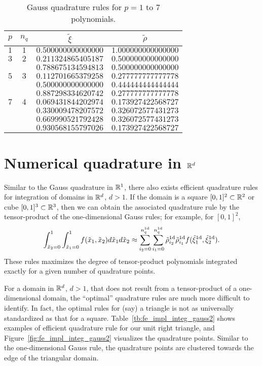 \begin{table}
  \centering
  \begin{tabular}{cccc}
    $p$ & $n_q$ & $\tilde \xi$ & $\tilde \rho$ \\
    \hline
    $1$ & $1$ & $0.500000000000000$ & $1.000000000000000$ \\
    \hline
    $3$ & $2$ & $0.211324865405187$ & $0.500000000000000$ \\ 
    & & $0.788675134594813$ & $0.500000000000000$ \\
    \hline
    $5$ & $3$ & $0.112701665379258$ & $0.277777777777778$ \\ 
     & & $0.500000000000000$ & $0.444444444444444$ \\ 
     & & $0.887298334620742$ & $0.277777777777778$ \\
    \hline
    $7$ & $4$ & $0.069431844202974$ & $0.173927422568727$ \\ 
    & & $0.330009478207572$ & $0.326072577431273$ \\ 
    & & $0.669990521792428$ & $0.326072577431273$ \\ 
    & & $0.930568155797026$ & $0.173927422568727$ 
  \end{tabular}
  \caption{Gauss quadrature rules for $p = 1$ to $7$ polynomials. \label{tb:fe_impl_gauss}}
  \label{tb:integ_gauss}
\end{table}

\section{Numerical quadrature in $\mathbb{R}^d$}
Similar to the Gauss quadrature in $\mathbb{R}^1$, there also exists efficient quadrature rules for integration of domains in $\mathbb{R}^d$, $d > 1$.  If the domain is a square $[0,1]^2 \subset \mathbb{R}^2$ or cube $[0,1]^3 \subset \mathbb{R}^3$, then we can obtain the associated quadrature rule by the tensor-product of the one-dimensional Gauss rules; for example, for $[0,1]^2$, 
\begin{equation*}
  \int_{\tilde x_2=0}^1 \int_{\tilde x_1=0}^1 f(\tilde x_1,\tilde x_2) d\tilde x_1 d\tilde x_2
  \approx \sum_{i_2 = 0}^{n_q^{\rm 1d}} \sum_{i_1 = 0}^{n_q^{\rm 1d}} \tilde \rho_{i_2}^{\rm 1d} \tilde \rho_{i_1}^{\rm 1d} f(\tilde \xi_1^{\rm 1d}, \tilde \xi_2^{\rm 1d}).
\end{equation*}
These rules maximizes the degree of tensor-product polynomials integrated exactly for a given number of quadrature points.

For a domain in $\mathbb{R}^d$, $d > 1$, that does not result from a tensor-product of a one-dimensional domain, the ``optimal'' quadrature rules are much more difficult to identify.  In fact, the optimal rules for (say) a triangle is not as universally standardized as that for a square. Table~\ref{tb:fe_impl_integ_gauss2} shows examples of efficient quadrature rule for our unit right triangle, and Figure~\ref{fig:fe_impl_integ_gauss2} visualizes the quadrature points.  Similar to the one-dimensional Gauss rule, the quadrature points are clustered towards the edge of the triangular domain.


